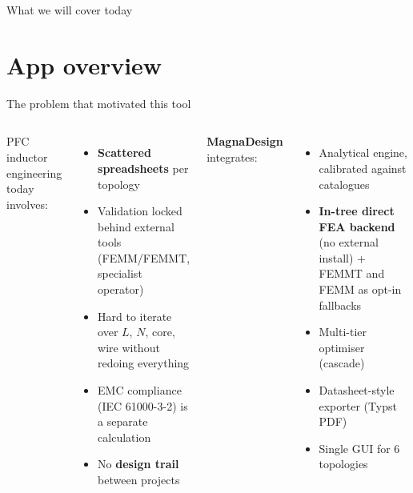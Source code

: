 \documentclass[11pt, aspectratio=169]{beamer}
\title{\app}
\subtitle{Engineering tool for PFC inductors and reactors}
\author{Internal training}
\institute{Variable-frequency drive engineering}
\date{\today}
\newcommand{\app}{\textbf{MagnaDesign}\xspace}
\begin{document}
\begin{frame}
  \titlepage
\end{frame}

\begin{frame}{What we will cover today}
  \tableofcontents
\end{frame}

\section{App overview}

\begin{frame}{The problem that motivated this tool}
  \begin{columns}[T,onlytextwidth]
    PFC inductor engineering today involves:
    \begin{itemize}
      \item \textbf{Scattered spreadsheets} per topology
      \item Validation locked behind external tools
            (FEMM/FEMMT, specialist operator)
      \item Hard to iterate over $L$, $N$, core, wire without
            redoing everything
      \item EMC compliance (IEC 61000-3-2) is a separate
            calculation
      \item No \textbf{design trail} between projects
    \end{itemize}
    \app integrates:
    \begin{itemize}
      \item Analytical engine, calibrated against catalogues
      \item \textbf{In-tree direct FEA backend} (no external
            install) + FEMMT and FEMM as opt-in fallbacks
      \item Multi-tier optimiser (cascade)
      \item Datasheet-style exporter (Typst PDF)
      \item Single GUI for 6 topologies
    \end{itemize}
  \end{columns}
\end{frame}
\end{document}
